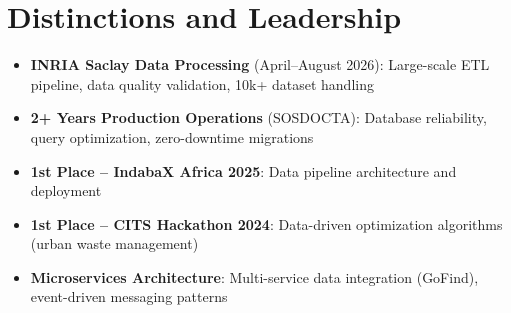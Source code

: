\documentclass[a4paper,11pt]{article}
\begin{document}
\section{Distinctions and Leadership}
\begin{itemize}[leftmargin=*, nosep]
    \item \textbf{INRIA Saclay Data Processing} (April--August 2026): Large-scale ETL pipeline, data quality validation, 10k+ dataset handling
    \item \textbf{2+ Years Production Operations} (SOSDOCTA): Database reliability, query optimization, zero-downtime migrations
    \item \textbf{1st Place -- IndabaX Africa 2025}: Data pipeline architecture and deployment
    \item \textbf{1st Place -- CITS Hackathon 2024}: Data-driven optimization algorithms (urban waste management)
    \item \textbf{Microservices Architecture}: Multi-service data integration (GoFind), event-driven messaging patterns
\end{itemize}
\end{document}
